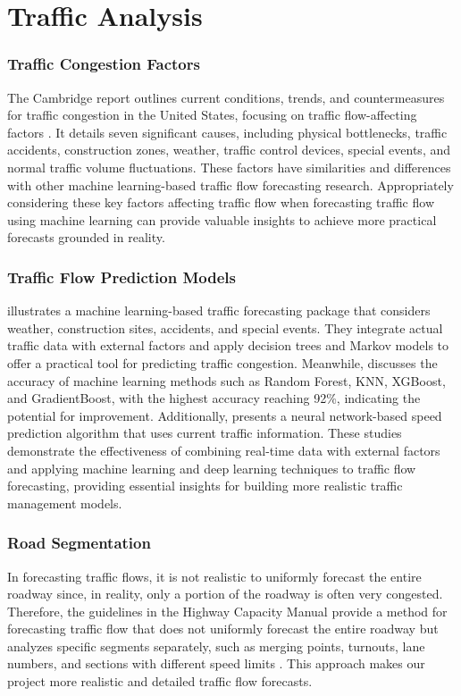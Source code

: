 \newpage

\section{Traffic Analysis}
\label{sec:traffic_analysis}
\subsubsection{Traffic Congestion Factors}
The Cambridge report outlines current conditions, trends, and countermeasures for traffic congestion in the United States, focusing on traffic flow-affecting factors \cite{systematics2005traffic}. It details seven significant causes, including physical bottlenecks, traffic accidents, construction zones, weather, traffic control devices, special events, and normal traffic volume fluctuations. These factors have similarities and differences with other machine learning-based traffic flow forecasting research. Appropriately considering these key factors affecting traffic flow when forecasting traffic flow using machine learning can provide valuable insights to achieve more practical forecasts grounded in reality.

\subsubsection{Traffic Flow Prediction Models}
\cite{garrett2020integrated} illustrates a machine learning-based traffic forecasting package that considers weather, construction sites, accidents, and special events. They integrate actual traffic data with external factors and apply decision trees and Markov models to offer a practical tool for predicting traffic congestion. Meanwhile, \cite{zafar2020traffic} discusses the accuracy of machine learning methods such as Random Forest, KNN, XGBoost, and GradientBoost, with the highest accuracy reaching 92\%, indicating the potential for improvement. Additionally, \cite{park2011real} presents a neural network-based speed prediction algorithm that uses current traffic information. These studies demonstrate the effectiveness of combining real-time data with external factors and applying machine learning and deep learning techniques to traffic flow forecasting, providing essential insights for building more realistic traffic management models.

\subsubsection{Road Segmentation}
In forecasting traffic flows, it is not realistic to uniformly forecast the entire roadway since, in reality, only a portion of the roadway is often very congested. Therefore, the guidelines in the Highway Capacity Manual provide a method for forecasting traffic flow that does not uniformly forecast the entire roadway but analyzes specific segments separately, such as merging points, turnouts, lane numbers, and sections with different speed limits \cite{bob2023freeway}. This approach makes our project more realistic and detailed traffic flow forecasts.

